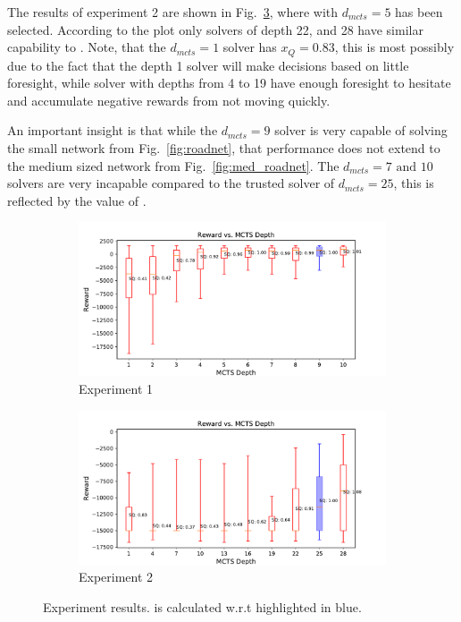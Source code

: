 The results of experiment 2 are shown in Fig.~\ref{fig:mcts_d_med}, where \solvestar{} with $d_{mcts}=5$ has been selected. According to the plot only solvers of depth 22, and 28 have similar capability to \solvestar{}. Note, that the $d_{mcts}=1$ solver has $x_Q=0.83$, this is most possibly due to the fact that the depth 1 solver will make decisions based on little foresight, while solver with depths from 4 to 19 have enough foresight to hesitate and accumulate negative rewards from not moving quickly.

An important insight is that while the $d_{mcts}=9$ solver is very capable of solving the small network from Fig.~\ref{fig:roadnet}, that performance does not extend to the medium sized network from Fig.~\ref{fig:med_roadnet}. The $d_{mcts}=7 \text{ and } 10$ solvers are very incapable compared to the trusted solver of $d_{mcts}=25$, this is reflected by the value of \xQ.

\begin{figure}[tbp]
    \centering
    \begin{subfigure}[b]{0.98\linewidth}
        \centering
        \includegraphics[width=1.0\linewidth]{Figures/sq_roadnet_mcts_i100e1000.pdf}
        \vfill
        \caption{Experiment 1}
        \label{fig:mcts_d}
    \end{subfigure}%
    \hfill
    \begin{subfigure}[b]{0.98\linewidth}
        \centering
        \includegraphics[width=1.0\linewidth]{Figures/sq_mednet_mcts_i1000e2000.pdf}
        \caption{Experiment 2}
        \label{fig:mcts_d_med}
    \end{subfigure} 
    \caption{Experiment results. \xQ{} is calculated w.r.t \solvestar{} highlighted in blue.}
    \vspace{-0.5cm}
\end{figure}

